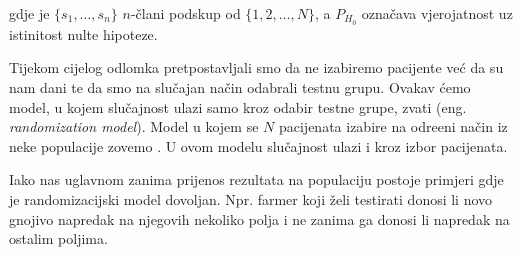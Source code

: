 \noindent
gdje je $\{s_{1},\dots,s_{n}\}$ $n$-\v{c}lani podskup od $\{ 1,2,\dots,N \}$,
a $P_{H_{0}}$ ozna\v{c}ava vjerojatnost uz istinitost nulte hipoteze.

Tijekom cijelog odlomka pretpostavljali smo da ne izabiremo pacijente ve\'{c} da su nam dani te
da smo na slu\v{c}ajan na\v{c}in odabrali testnu grupu. Ovakav \'{c}emo model, u kojem
slu\v{c}ajnost ulazi samo kroz odabir testne grupe, zvati 
(eng. \textit{randomization model}). Model u kojem se $N$ pacijenata
izabire na odre\dj{}eni na\v{c}in iz neke populacije zovemo .
U ovom modelu slu\v{c}ajnost ulazi i kroz izbor pacijenata.

Iako nas uglavnom zanima prijenos rezultata na populaciju postoje primjeri
gdje je randomizacijski model dovoljan. Npr. farmer koji \v{z}eli testirati
donosi li novo gnojivo napredak na njegovih nekoliko polja 
i ne zanima ga donosi li napredak na ostalim poljima.

